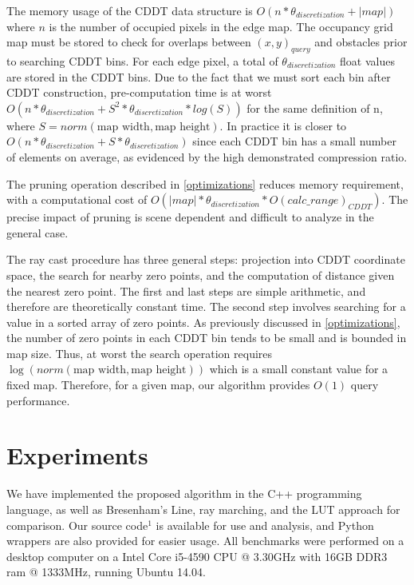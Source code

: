 \documentclass[letterpaper, 10 pt, conference]{ieeeconf}  %
\begin{document}
The memory usage of the CDDT data structure is $O(n*\theta_{discretization}+|map|)$ where $n$ is the number of occupied pixels in the edge map. The occupancy grid map must be stored to check for overlaps between $(x,y)_{query}$ and obstacles prior to searching CDDT bins. For each edge pixel, a total of $\theta_{discretization}$ float values are stored in the CDDT bins. Due to the fact that we must sort each bin after CDDT construction, pre-computation time is at worst $O(n*\theta_{discretization} + S^2*\theta_{discretization}*log(S))$ for the same definition of n, where $S=norm(\text{map width},\text{map height})$. In practice it is closer to $O(n*\theta_{discretization} + S*\theta_{discretization})$ since each CDDT bin has a small number of elements on average, as evidenced by the high demonstrated compression ratio.

The pruning operation described in \ref{optimizations} reduces memory requirement, with a computational cost of $O(|map|*\theta_{discretization}*O(calc\_range)_{CDDT})$. The precise impact of pruning is scene dependent and difficult to analyze in the general case.

The ray cast procedure has three general steps: projection into CDDT coordinate space, the search for nearby zero points, and the computation of distance given the nearest zero point. The first and last steps are simple arithmetic, and therefore are theoretically constant time. The second step involves searching for a value in a sorted array of zero points. As previously discussed in \ref{optimizations}, the number of zero points in each CDDT bin tends to be small and is bounded in map size. Thus, at worst the search operation requires $\log{(norm(\text{map width},\text{map height}))}$ which is a small constant value for a fixed map. Therefore, for a given map, our algorithm provides $O(1)$ query performance.

\section{Experiments}

We have implemented the proposed algorithm in the C++ programming language, as well as Bresenham’s Line, ray marching, and the LUT approach for comparison. Our source code$^1$ is available for use and analysis, and Python wrappers are also provided for easier usage. All benchmarks were performed on a desktop computer on a Intel Core i5-4590 CPU @ 3.30GHz with 16GB DDR3 ram @ 1333MHz, running Ubuntu 14.04.
\end{document}
